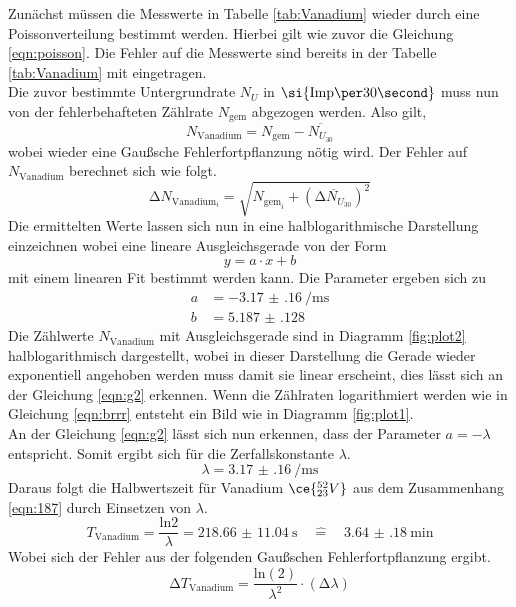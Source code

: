 Zunächst müssen die Messwerte in Tabelle \ref{tab:Vanadium} wieder durch eine Poissonverteilung bestimmt werden.
Hierbei gilt wie zuvor die Gleichung \ref{eqn:poisson}. Die Fehler auf die Messwerte sind bereits in der 
Tabelle \ref{tab:Vanadium} mit eingetragen.
\\
\newline
Die zuvor bestimmte Untergrundrate $N_{U}$ in $\si{{\text{Imp\per}{30}}\second}$ muss nun von der fehlerbehafteten Zählrate
$N_{\text{gem}}$ abgezogen werden. Also gilt,
\begin{equation*}
N_{\text{Vanadium}} = N_{\text{gem}} - \overline{N_{U_{30}}}
\end{equation*}
wobei wieder eine Gaußsche Fehlerfortpflanzung nötig wird. Der Fehler auf $N_{\text{Vanadium}}$ berechnet sich wie folgt.
\begin{equation*}
\increment N_{{\text{Vanadium}_{i}}} = \sqrt{N_{{\text{gem}_{i}}} + (\overline{\increment N_{U_{30}}})^{2} }
\end{equation*}
Die ermittelten Werte lassen sich nun in eine halblogarithmische Darstellung einzeichnen wobei eine lineare Ausgleichsgerade
von der Form
\begin{equation}
\label{eqn:lin}
y = a \cdot x + b
\end{equation}
mit einem linearen Fit bestimmt werden kann. Die Parameter ergeben sich zu
\begin{align}
a &= \SI{-3.17(16)}{\per\milli\second} \\
b &= \SI{5.187(128)}{}
\end{align}
Die Zählwerte $N_{\text{Vanadium}}$ mit Ausgleichsgerade sind in Diagramm \ref{fig:plot2} halblogarithmisch dargestellt, wobei in dieser Darstellung die Gerade wieder exponentiell angehoben werden muss damit sie linear erscheint, dies lässt sich
an der Gleichung \eqref{eqn:g2} erkennen.
Wenn die Zählraten logarithmiert werden wie in Gleichung \eqref{eqn:brrr} entsteht ein Bild wie in Diagramm \ref{fig:plot1}.
\\
\newline
An der Gleichung \eqref{eqn:g2} lässt sich nun erkennen, dass der Parameter $a = -\lambda$ entspricht. Somit ergibt sich für die 
Zerfallskonstante $\lambda$.
\begin{equation}
\lambda = \SI{3.17(16)}{\per\milli\second} 
\end{equation}
Daraus folgt die Halbwertszeit für Vanadium $\ce{^{52}_{23}V}$ aus dem Zusammenhang \eqref{eqn:187} durch Einsetzen von $\lambda$.
\begin{equation}
T_{\text{Vanadium}} = \frac{\text{ln}2}{\lambda} = \SI{218.66(1104)}{\second} \quad  \widehat{=} \quad \SI{3.64(18)}{\minute}
\end{equation}
Wobei sich der Fehler aus der folgenden Gaußschen Fehlerfortpflanzung ergibt.
\begin{equation}
\increment T_{\text{Vanadium}} = \frac{\text{ln}(2)}{\lambda^{2}} \cdot (\increment \lambda)
\end{equation}

